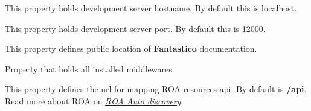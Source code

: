\documentclass[letterpaper,10pt,english]{sphinxmanual}
\begin{document}
\begin{fulllineitems}
\begin{fulllineitems}
\label{get_started/settings:fantastico.settings.BasicSettings.dev_server_host}
This property holds development server hostname. By default this is localhost.

\end{fulllineitems}


\begin{fulllineitems}
\label{get_started/settings:fantastico.settings.BasicSettings.dev_server_port}
This property holds development server port. By default this is 12000.

\end{fulllineitems}


\begin{fulllineitems}
\label{get_started/settings:fantastico.settings.BasicSettings.doc_base}
This property defines public location of \textbf{Fantastico} documentation.

\end{fulllineitems}


\begin{fulllineitems}
\label{get_started/settings:fantastico.settings.BasicSettings.installed_middleware}
Property that holds all installed middlewares.

\end{fulllineitems}


\begin{fulllineitems}
\label{get_started/settings:fantastico.settings.BasicSettings.roa_api}
This property defines the url for mapping ROA resources api. By default is \textbf{/api}. Read more about ROA on
{\hyperref[features/components/roa_discovery/roa_discovery::doc]{\emph{ROA Auto discovery}}}.

\end{fulllineitems}



\end{fulllineitems}
\end{document}
